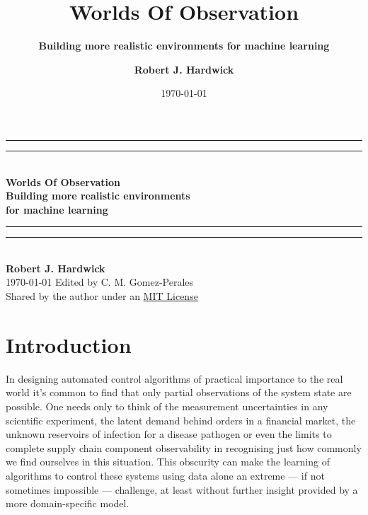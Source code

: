 \documentclass{book}
\title{\Huge \bfseries\sffamily Worlds Of Observation}
\subtitle{\Large \bfseries\sffamily \color{gray75} Building more realistic environments for machine learning}
\author{\bfseries\sffamily Robert J. Hardwick}
\date{\today}
\begin{document}
\begin{titlepage}
\centering
\vspace*{1.5\baselineskip}
{\color{gray75}\rule{13cm}{1.3pt}}\vspace*{-\baselineskip}\vspace*{2pt} %
{\color{gray75}\rule{13cm}{0.4pt}} \\ %
\vspace{1.2\baselineskip} %
{\Huge \bfseries\sffamily Worlds Of Observation} \\ 
\vspace{4mm}
{\Large \bfseries\sffamily \color{gray75} Building more realistic environments\\ for machine learning \\}
\vspace*{0.75\baselineskip}
{\color{gray75}\rule{13cm}{0.4pt}}\vspace*{-\baselineskip}\vspace*{2.75pt} %
{\color{gray75}\rule{13cm}{1.3pt}} \\ %
\vspace{1.0\baselineskip} %
{\large \bfseries\sffamily Robert J. Hardwick \\
\vspace*{1.2\baselineskip}}
\today
\vfill
Edited by C. M. Gomez-Perales \\ \vspace{1mm}
Shared by the author under an \href{https://opensource.org/licenses/MIT}{MIT License}
\end{titlepage}

\chapter*{Introduction}

In designing automated control algorithms of practical importance to the real world it's common to find that only partial observations of the system state are possible. One needs only to think of the measurement uncertainties in any scientific experiment, the latent demand behind orders in a financial market, the unknown reservoirs of infection for a disease pathogen or even the limits to complete supply chain component observability in recognising just how commonly we find ourselves in this situation. This obscurity can make the learning of algorithms to control these systems using data alone an extreme --- if not sometimes impossible --- challenge, at least without further insight provided by a more domain-specific model.
\end{document}

